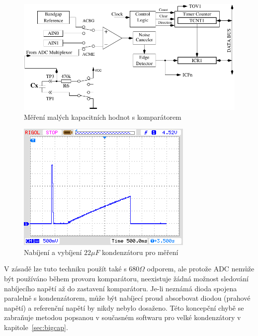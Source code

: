 \begin{figure}[H]
\centering
\includegraphics[width=.8\textwidth]{../FIG/Comparat.pdf}
\caption{Měření malých kapacitních hodnot s komparátorem}
\label{fig:comparat}
\end{figure}

\begin{figure}[H]
  \centering
    \includegraphics[width=.8\textwidth]{../PNG/charge_22uF.png}
  \caption{Nabíjení a vybíjení \(22\mu F\) kondenzátoru pro měření}
  \label{pic:c22uF}
\end{figure}


V zásadě lze tuto techniku použít také s \(680\Omega\) odporem,
ale protože ADC nemůže být používáno během provozu komparátoru, neexistuje žádná
možnost sledování nabíjecího napětí až do zastavení komparátoru.
Je-li neznámá dioda spojena paralelně s kondenzátorem, může být nabíjecí proud
absorbovat diodou (prahové napětí) a referenční napětí by nikdy nebylo dosaženo.
Této koncepční chybě se zabraňuje metodou popsanou v současném softwaru pro velké kondenzátory
v kapitole~\ref{sec:bigcap}.
